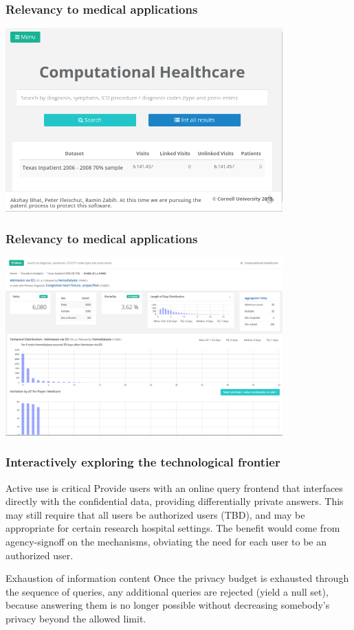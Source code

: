 \begin{frame}
	\frametitle{Relevancy to medical applications}\centering
\includegraphics[width=0.8\textwidth]{Screenshot_system_20151002}
\end{frame}

\begin{frame}
	\frametitle{Relevancy to medical applications}\centering
	\includegraphics[width=0.8\textwidth]{Screenshot_system_20151003}
	\end{frame}

\begin{frame}
	\frametitle{Interactively exploring the technological frontier}
	\begin{block}{Active use is critical}
Provide users with an online query frontend that
interfaces directly with the confidential data, providing differentially private answers. This may still require
that all users be authorized users (TBD), and may be appropriate for certain research hospital settings.	The benefit would come from agency-signoff on the mechanisms, obviating the need for each user to be an authorized user.
\end{block}
\begin{block}{Exhaustion of information content}
Once the privacy budget is exhausted through the sequence of queries, any additional queries are rejected (yield a null set), because answering them is no longer possible without decreasing somebody's privacy beyond the allowed limit.
\end{block}
\end{frame}

